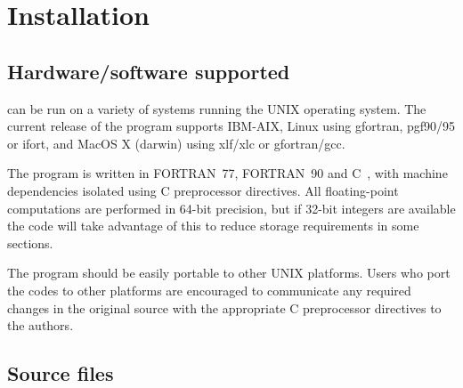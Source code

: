 \chapter{Installation}\label{ch:install}

\section{Hardware/software
supported}\label{sec:hardsoft}

{\dalton} can be run on a variety of systems running the UNIX
operating system. The current release of the program supports
IBM-AIX,
Linux using gfortran, pgf90/95 or ifort, and 
MacOS X (darwin) using xlf/xlc or gfortran/gcc.

The program is written in FORTRAN~77, 
FORTRAN~90 and C~, with
machine dependencies isolated using C preprocessor directives.  
All floating-point computations are performed in 64-bit precision, 
but if 32-bit integers are available the code will take advantage of this to reduce storage
requirements in some sections.

The program should be easily portable to other UNIX
platforms.
Users who port the codes to other platforms are encouraged to
communicate any required changes in the original source with the
appropriate C preprocessor directives to the authors.

\section{Source files}\label{sec:source}

